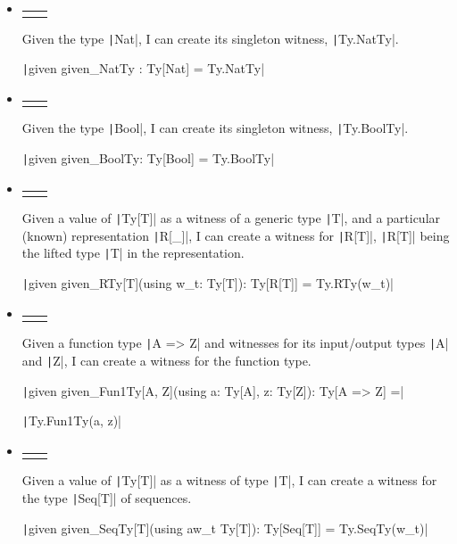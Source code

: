 \documentclass[11pt]{article}
\newcommand{\infrule}[3]{\begin{tabular}{ll} \fbox{\textsf{#1}} & \inference{#2}{#3} \end{tabular}}
\newcommand{\ScalaI}[1]{\texttt|#1|}
\begin{document}
\begin{itemize}
  \item
  \infrule{NAT-TY-W}%
  {\ScalaI{Nat}: Type}%
  {w(\ScalaI{Nat}) = \ScalaI{Ty.NatTy}}
  
  Given the type \ScalaI{Nat}, I can create its singleton witness, \ScalaI{Ty.NatTy}.
  
  \ScalaI{given given_NatTy : Ty[Nat] = Ty.NatTy}
  
  \item
  \infrule{BOOL-TY-W}%
  {\ScalaI{Bool}: Type}%
  {w(\ScalaI{Bool}) = \ScalaI{Ty.BoolTy}}
  
  Given the type \ScalaI{Bool}, I can create its singleton witness, \ScalaI{Ty.BoolTy}.
  
  \ScalaI{given given_BoolTy: Ty[Bool] = Ty.BoolTy}
  
  \item
  \infrule{R-TY-W}%
  {w(\ScalaI{T}): \ScalaI{Ty[T]}, \quad \ScalaI{R[_]}: Type}%
  {w(\ScalaI{R[T]}): \ScalaI{Ty[R[T]]} = \ScalaI{Ty.RTy(w(T))}}
  
  Given a value of \ScalaI{Ty[T]} as a witness of a generic type \ScalaI{T}, 
  and a particular (known) representation \ScalaI{R[_]}, I can create a 
  witness for \ScalaI{R[T]}, \ScalaI{R[T]} being the lifted type \ScalaI{T} 
  in the representation.
  
  \ScalaI{given given_RTy[T](using w_t: Ty[T]): Ty[R[T]] = Ty.RTy(w_t)}
  
  \item
  \infrule{FUN1-TY-W}%
  {w(\ScalaI{A}): \ScalaI{Ty[A]}, \quad w(\ScalaI{Z}): \ScalaI{Ty[Z]}}%
  {w(\ScalaI{A => Z}): \ScalaI{Ty[A => Z]} = \ScalaI{Ty.Fun1Ty(w(A), w(Z))}}
  
  Given a function type \ScalaI{A => Z} and witnesses for its input/output 
  types \ScalaI{A} and \ScalaI{Z}, I can create a witness for the function 
  type.

  \ScalaI{given given_Fun1Ty[A, Z](using a: Ty[A], z: Ty[Z]): Ty[A => Z] =}

  \hspace*{\widthof{\ScalaI{gi}}}\ScalaI{Ty.Fun1Ty(a, z)}

  \item
  \infrule{SEQ-TY-W}%
  {w(\ScalaI{T}): \ScalaI{Ty[T]}}%
  {w(\ScalaI{Seq[T]}): \ScalaI{Ty[Seq[T]]} = \ScalaI{Ty.SeqTy(w(T))}}
  
  Given a value of \ScalaI{Ty[T]} as a witness of type \ScalaI{T}, I can 
  create a witness for the type \ScalaI{Seq[T]} of sequences.
  
  \ScalaI{given given_SeqTy[T](using aw_t Ty[T]): Ty[Seq[T]] = Ty.SeqTy(w_t)}
\end{itemize}
\end{document}
